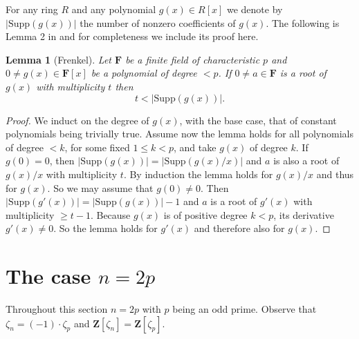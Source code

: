 \documentclass[a4paper,12pt,reqno]{amsart}
\newtheorem{lemma}[theorem]{Lemma}
\def\Z{\mathbf{Z}}
\def\F{\mathbf{F}}
\def\Supp{\mathrm{Supp}}
\begin{document}
For any ring  $R$ and  any polynomial $g(x) \in R[x]$ 
we denote by $|\Supp(g(x))|$ the number of nonzero coefficients of $g(x)$. 
The following is Lemma 2 in \cite{Frenkel} and  for completeness we include its proof here.  
\begin{lemma}[Frenkel]\label{Lem:Frenkel}
Let  $ \F$ be a finite field of characteristic $p$ and    $0 \neq g(x) \in  \F[x]$  be a polynomial of degree $<p$. If $0 \neq a \in \F$ is a root of $g(x) $ with multiplicity $t$ then 
\[
t< |\Supp(g(x))|.
\]
\end{lemma}


\begin{proof}
We induct on the degree of $g(x)$,  with the base case, that of  constant polynomials being trivially true. 
Assume now the lemma holds for all polynomials of degree $<k$, for some fixed $1 \leq k <p$, and take $g(x)$ of degree $k$. If $g(0)= 0 $, then $|\Supp(g(x))|= |\Supp(g(x)/x)|$  and  $a$ is also a root of $g(x)/x$ with multiplicity $t$. By induction the lemma holds for $g(x)/x$ and thus for $g(x)$. So we may assume that $g(0) \neq 0 $. Then $|\Supp(g'(x))| = |\Supp(g(x))|-1$ and $a$ is a root of $g'(x)$ with multiplicity $\geq t-1$.
Because $g(x)$ is of positive degree $k < p$, its derivative  $g'(x) \neq 0$. So the lemma holds for $g'(x)$ and therefore also for $g(x)$. 
\end{proof}

\section{The case $n=2p$ }\label{Sec:n=2p}

Throughout this  section $n=2p$ with  $p$ being an odd prime. Observe that   $\zeta_n= (-1) \cdot \zeta_p$ and $\Z[\zeta_n]=\Z[\zeta_p]$. 
\end{document}

